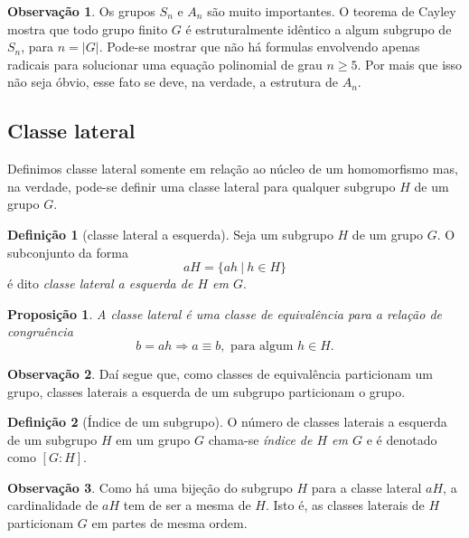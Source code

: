 \documentclass[a4paper,12pt]{report}
\theoremstyle{plain}
\newtheorem{proposicao}{Proposição}[section]
\theoremstyle{definition}
\newtheorem{definicao}{Definição}[section]
\newtheorem{observacao}{Observação}[section]
\begin{document}
\begin{observacao}
	Os grupos $S_n$ e $A_n$ são muito importantes. O teorema de Cayley mostra que todo grupo finito $G$ é estruturalmente idêntico a algum subgrupo de $S_n$, para $n = |G|$. Pode-se mostrar que não há formulas envolvendo apenas radicais para solucionar uma equação polinomial de grau $n\geq 5$. Por mais que isso não seja óbvio, esse fato se deve, na verdade, a estrutura de $A_n$.
\end{observacao}


\subsection{Classe lateral}

Definimos classe lateral somente em relação ao núcleo de um homomorfismo mas,
na verdade, pode-se definir uma classe lateral para qualquer subgrupo \(H\) de
um grupo \(G\).

\begin{definicao}[classe lateral a esquerda]
	Seja um subgrupo \(H\) de um grupo \(G\). O
	subconjunto da forma \[aH = \{ah \ | \ h\in H\}\] é dito \emph{classe lateral a esquerda de \(H\) em \(G\)}.
\end{definicao}

\begin{proposicao}
	A classe lateral é uma classe de equivalência para a
	relação de congruência
	\[b = ah \Rightarrow a \equiv b, \text{ para algum } h\in H.\]	
\end{proposicao}

\begin{observacao}
	Daí segue que, como classes de equivalência particionam um grupo,
	classes laterais a esquerda de um subgrupo particionam o grupo.
\end{observacao}

\begin{definicao}[Índice de um subgrupo]
	O número de classes laterais a esquerda de um subgrupo
	\(H\) em um grupo \(G\) chama-se \emph{índice de \(H\) em \(G\)} e é
	denotado como \([G:H]\).	
\end{definicao}

\begin{observacao}
	Como há uma bijeção do subgrupo \(H\) para a classe lateral \(aH\), a
	cardinalidade de \(aH\) tem de ser a mesma de \(H\). Isto é, as
	classes laterais de \(H\) particionam \(G\) em partes de mesma ordem.
\end{observacao}
\end{document}
